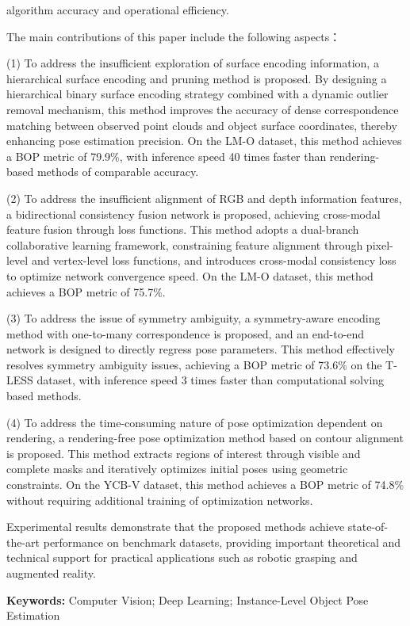 algorithm accuracy and operational efficiency.
\par The main contributions of this paper include the following aspects：
\par (1) To address the insufficient exploration of surface encoding information, a hierarchical surface encoding and pruning method is proposed. By designing a hierarchical binary surface encoding strategy combined with a dynamic outlier removal mechanism, this method improves the accuracy of dense correspondence matching between observed point clouds and object surface coordinates, thereby enhancing pose estimation precision. On the LM-O dataset, this method achieves a BOP metric of 79.9\%, with inference speed 40 times faster than rendering-based methods of comparable accuracy.
\par (2) To address the insufficient alignment of RGB and depth information features, a bidirectional consistency fusion network is proposed, achieving cross-modal feature fusion through loss functions. This method adopts a dual-branch collaborative learning framework, constraining feature alignment through pixel-level and vertex-level loss functions, and introduces cross-modal consistency loss to optimize network convergence speed. On the LM-O dataset, this method achieves a BOP metric of 75.7\%.
\par (3) To address the issue of symmetry ambiguity, a symmetry-aware encoding method with one-to-many correspondence is proposed, and an end-to-end network is designed to directly regress pose parameters. This method effectively resolves symmetry ambiguity issues, achieving a BOP metric of 73.6\% on the T-LESS dataset, with inference speed 3 times faster than computational solving based methods.
\par (4) To address the time-consuming nature of pose optimization dependent on rendering, a rendering-free pose optimization method based on contour alignment is proposed. This method extracts regions of interest through visible and complete masks and iteratively optimizes initial poses using geometric constraints. On the YCB-V dataset, this method achieves a BOP metric of 74.8\% without requiring additional training of optimization networks.
\par Experimental results demonstrate that the proposed methods achieve state-of-the-art performance on benchmark datasets, providing important theoretical and technical support for practical applications such as robotic grasping and augmented reality.
\par \textbf{Keywords:} Computer Vision; Deep Learning; Instance-Level Object Pose Estimation

